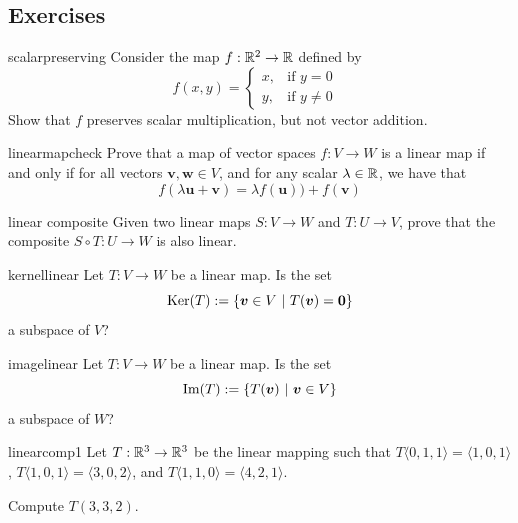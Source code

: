 



\subsection{Exercises}



\begin{problem}{scalarpreserving}
Consider the map $f: \mathbb{R}^2 \to \mathbb{R}$ defined by $$f(x,y) =
\begin{cases}
x,  & \text{if $y=0$ } \\
y, & \text{if $y\neq 0$ }
\end{cases}$$
Show that $f$ preserves scalar multiplication, but not vector addition.
\end{problem}

\begin{problem}{linearmapcheck}
Prove that a map of vector spaces $f: V \to W$ is a linear map if and only if for all vectors $\bm{v}, \bm{w} \in V$, and for any scalar $\lambda \in \mathbb{R}$, we have that
$$f(\lambda \bm{u} + \bm{v}) = \lambda f(\bm{u}))+ f(\bm{v})$$

\end{problem}

\begin{problem}{linear composite}
Given two linear maps $S: V \to W$ and $T : U \to V$, prove that the composite $S \circ T : U \to W$ is also linear.
\end{problem}

\begin{problem}{kernellinear}
Let $T : V \to W$ be a linear map.  Is the set $$\textnormal{Ker}(T) := \{ \bm{v} \in V \ | \ T(\bm{v}) = \bm{0} \}$$ a subspace of $V$?
\end{problem}

\begin{problem}{imagelinear}
Let $T : V \to W$ be a linear map.  Is the set $$\textnormal{Im}(T) := \{ T(\bm{v}) \ | \ \bm{v} \in V\}$$ a subspace of $W$?
\end{problem}

\begin{problem}{linearcomp1}
    Let $T : \mathbb{R}^3 \to \mathbb{R}^3$ be the linear mapping such that $T\langle0,1,1\rangle = \langle1,0,1\rangle$, $T\langle1,0,1\rangle = \langle3,0,2\rangle$, and $T\langle1,1,0\rangle = \langle4,2,1\rangle$. 
    
    Compute $T(3, 3, 2)$.
\end{problem}

